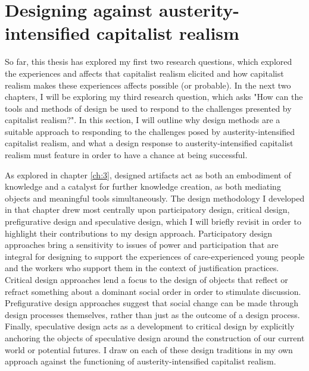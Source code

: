 \section{Designing against austerity-intensified capitalist realism}
So far, this thesis has explored my first two research questions, which explored the experiences and affects that capitalist realism elicited and how capitalist realism makes these experiences affects possible (or probable). In the next two chapters, I will be exploring my third research question, which asks "How can the tools and methods of design be used to respond to the challenges presented by capitalist realism?". In this section, I will outline why design methods are a suitable approach to responding to the challenges posed by austerity-intensified capitalist realism, and what a design response to austerity-intensified capitalist realism must feature in order to have a chance at being successful. 

As explored in chapter \ref{ch:3}, designed artifacts act as both an embodiment of knowledge and a catalyst for further knowledge creation, as both mediating objects and meaningful tools simultaneously. The design methodology I developed in that chapter drew most centrally upon participatory design, critical design, prefigurative design and speculative design, which I will briefly revisit in order to highlight their contributions to my design approach. Participatory design approaches bring a sensitivity to issues of power and participation that are integral for designing to support the experiences of care-experienced young people and the workers who support them in the context of justification practices. Critical design approaches lend a focus to the design of objects that reflect or refract something about a dominant social order in order to stimulate discussion. Prefigurative design approaches suggest that social change can be made through design processes themselves, rather than just as the outcome of a design process. Finally, speculative design acts as a development to critical design by explicitly anchoring the objects of speculative design around the construction of our current world or potential futures. I draw on each of these design traditions in my own approach against the functioning of austerity-intensified capitalist realism. 

